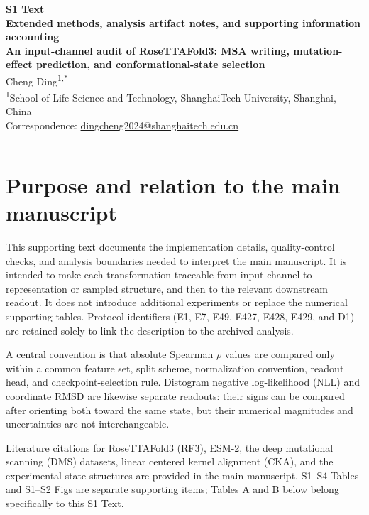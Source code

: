 \documentclass[10pt,a4paper]{article}
\begin{document}
\begin{center}
    {\Large\textbf{\color{primary}S1 Text}}\\[8pt]
    {\LARGE\textbf{\color{primary}Extended methods, analysis artifact notes, and supporting information accounting}}\\[12pt]
    {\large\textbf{An input-channel audit of RoseTTAFold3: MSA writing, mutation-effect prediction, and conformational-state selection}}\\[12pt]
    {\normalsize Cheng Ding\textsuperscript{1,*}}\\[6pt]
    {\small \textsuperscript{1}School of Life Science and Technology, ShanghaiTech University, Shanghai, China}\\[3pt]
    {\small * Correspondence: \href{mailto:dingcheng2024@shanghaitech.edu.cn}{dingcheng2024@shanghaitech.edu.cn}}
\end{center}

\vspace{4pt}
\noindent\textcolor{rulecolor}{\rule{\textwidth}{0.8pt}}

\section{Purpose and relation to the main manuscript}

This supporting text documents the implementation details, quality-control checks, and analysis boundaries needed to interpret the main manuscript. It is intended to make each transformation traceable from input channel to representation or sampled structure, and then to the relevant downstream readout. It does not introduce additional experiments or replace the numerical supporting tables. Protocol identifiers (E1, E7, E49, E427, E428, E429, and D1) are retained solely to link the description to the archived analysis.

A central convention is that absolute Spearman $\rho$ values are compared only within a common feature set, split scheme, normalization convention, readout head, and checkpoint-selection rule. Distogram negative log-likelihood (NLL) and coordinate RMSD are likewise separate readouts: their signs can be compared after orienting both toward the same state, but their numerical magnitudes and uncertainties are not interchangeable.

Literature citations for RoseTTAFold3 (RF3), ESM-2, the deep mutational scanning (DMS) datasets, linear centered kernel alignment (CKA), and the experimental state structures are provided in the main manuscript. S1--S4 Tables and S1--S2 Figs are separate supporting items; Tables A and B below belong specifically to this S1 Text.
\end{document}
